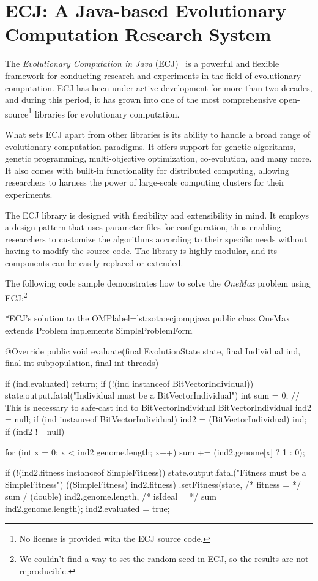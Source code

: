 \section{ECJ: A Java-based Evolutionary Computation Research System}
\label{sec:sota:ecj}
  The \emph{Evolutionary Computation in Java} (ECJ)~\autocite{ECJ} is a powerful and flexible framework for conducting research and experiments in 
  the field of evolutionary computation.
  ECJ has been under active development for more than two decades, and during 
  this period, it has grown into one of the most comprehensive 
  open-source\footnote{No license is provided with the ECJ source code.} 
  libraries for evolutionary computation.

  What sets ECJ apart from other libraries is its ability to handle a broad 
  range of evolutionary computation paradigms.
  It offers support for genetic algorithms, genetic programming, 
  multi-objective optimization, co-evolution, and many more.
  It also comes with built-in functionality for distributed computing, allowing 
  researchers to harness the power of large-scale computing clusters for their 
  experiments.

  The ECJ library is designed with flexibility and extensibility in mind.
  It employs a design pattern that uses parameter files for configuration, thus 
  enabling researchers to customize the algorithms according to their specific 
  needs without having to modify the source code.
  The library is highly modular, and its components can be easily replaced or 
  extended.

  The following code sample demonstrates how to solve the \textit{OneMax} 
  problem using ECJ:\footnote{We couldn't find a way to set the random seed in
  ECJ, so the results are not reproducible.}

  \begin{code}*{ECJ's solution to the OMP}{label=lst:sota:ecj:omp}{java}
    public class OneMax extends Problem implements SimpleProblemForm {
      @Override
      public void evaluate(final EvolutionState state,
                          final Individual ind,
                          final int subpopulation,
                          final int threads) {
        if (ind.evaluated) {
          return;
        }
        if (!(ind instanceof BitVectorIndividual)) {
          state.output.fatal("Individual must be a BitVectorIndividual")
        }
        int sum = 0;
        // This is necessary to safe-cast ind to BitVectorIndividual
        BitVectorIndividual ind2 = null;
        if (ind instanceof BitVectorIndividual) {
          ind2 = (BitVectorIndividual) ind;
        }
        if (ind2 != null) {
          for (int x = 0; x < ind2.genome.length; x++) {
            sum += (ind2.genome[x] ? 1 : 0);
          }

          if (!(ind2.fitness instanceof SimpleFitness)) {
            state.output.fatal("Fitness must be a SimpleFitness")
          }
          ((SimpleFitness) ind2.fitness)
              .setFitness(state,
                  /* fitness = */ sum / (double) ind2.genome.length,
                  /* isIdeal = */ sum == ind2.genome.length);
          ind2.evaluated = true;
        }
      }
    }
  \end{code}

